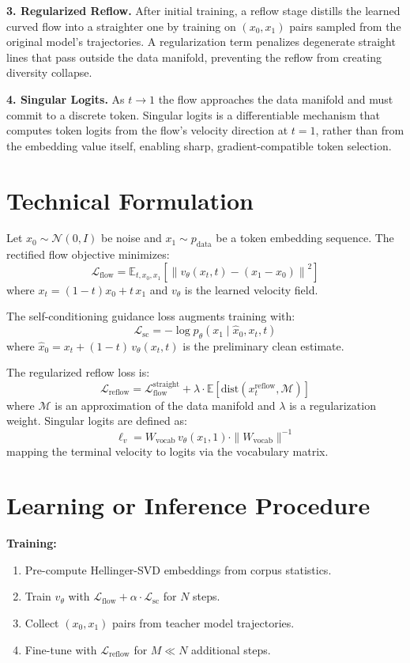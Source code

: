 \documentclass[10pt,twocolumn]{article}
\begin{document}
\textbf{3. Regularized Reflow.} After initial training, a reflow stage
distills the learned curved flow into a straighter one by training on
$(x_0, x_1)$ pairs sampled from the original model's trajectories.
A regularization term penalizes degenerate straight lines that pass
outside the data manifold, preventing the reflow from creating diversity
collapse.

\textbf{4. Singular Logits.} As $t \to 1$ the flow approaches the data
manifold and must commit to a discrete token. Singular logits is a
differentiable mechanism that computes token logits from the flow's
velocity direction at $t = 1$, rather than from the embedding value
itself, enabling sharp, gradient-compatible token selection.

\section{Technical Formulation}

Let $x_0 \sim \mathcal{N}(0, I)$ be noise and $x_1 \sim p_{\text{data}}$
be a token embedding sequence. The rectified flow objective minimizes:
\[
\mathcal{L}_{\text{flow}} = \mathbb{E}_{t, x_0, x_1}\!\left[
  \left\| v_\theta(x_t, t) - (x_1 - x_0) \right\|^2
\right]
\]
where $x_t = (1-t)x_0 + t\, x_1$ and $v_\theta$ is the learned velocity
field.

The self-conditioning guidance loss augments training with:
\[
\mathcal{L}_{\text{sc}} = -\log p_\theta(x_1 \mid \hat{x}_0, x_t, t)
\]
where $\hat{x}_0 = x_t + (1-t)\,v_\theta(x_t, t)$ is the preliminary
clean estimate.

The regularized reflow loss is:
\[
\mathcal{L}_{\text{reflow}} = \mathcal{L}_{\text{flow}}^{\text{straight}}
  + \lambda \cdot \mathbb{E}\!\left[\text{dist}(x_t^{\text{reflow}},
  \mathcal{M})\right]
\]
where $\mathcal{M}$ is an approximation of the data manifold and $\lambda$
is a regularization weight. Singular logits are defined as:
\[
\ell_v = W_{\text{vocab}}\, v_\theta(x_1, 1) \cdot \|W_{\text{vocab}}\|^{-1}
\]
mapping the terminal velocity to logits via the vocabulary matrix.

\section{Learning or Inference Procedure}

\textbf{Training:}
\begin{enumerate}[itemsep=2pt,parsep=0pt]
  \item Pre-compute Hellinger-SVD embeddings from corpus statistics.
  \item Train $v_\theta$ with $\mathcal{L}_{\text{flow}} + \alpha \cdot
    \mathcal{L}_{\text{sc}}$ for $N$ steps.
  \item Collect $(x_0, x_1)$ pairs from teacher model trajectories.
  \item Fine-tune with $\mathcal{L}_{\text{reflow}}$ for $M \ll N$
    additional steps.
\end{enumerate}
\end{document}
